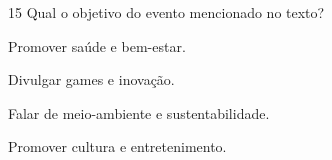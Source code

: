 

\num{15} Qual o objetivo do evento mencionado no texto?

\begin{escolha}
\item
  Promover saúde e bem-estar.
\item
  Divulgar games e inovação.
\item
  Falar de meio-ambiente e sustentabilidade.
\item
  Promover cultura e entretenimento.
\end{escolha}






